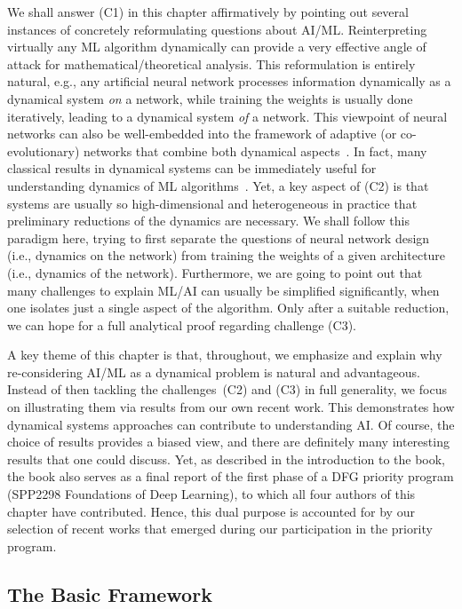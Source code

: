 \documentclass[10pt]{article}
\begin{document}
We shall answer (C1) in this chapter affirmatively by pointing out several instances of concretely reformulating questions about AI/ML. Reinterpreting virtually any ML algorithm dynamically can provide a very effective angle of attack for mathematical/theoretical analysis. This reformulation is entirely natural, e.g., any artificial neural network processes information dynamically as a dynamical system \emph{on} a network, while training the weights is usually done iteratively, leading to a dynamical system \emph{of} a network. This viewpoint of neural networks can also be well-embedded into the framework of adaptive (or co-evolutionary) networks that combine both dynamical aspects~\cite{Berneretal}. 
In fact, many classical results in dynamical systems can be immediately useful for understanding dynamics of ML algorithms~\cite{https://doi.org/10.48550/arxiv.2110.10295,Sharkovskii1}.
Yet, a key aspect of (C2) is that systems are usually so high-dimensional and heterogeneous in practice that preliminary reductions of the dynamics are necessary. We shall follow this paradigm here, trying to first separate the questions of neural network design (i.e., dynamics on the network) from training the weights of a given architecture (i.e., dynamics of the network). Furthermore, we are going to point out that many challenges to explain ML/AI can usually be simplified significantly, when one isolates just a single aspect of the algorithm. Only after a suitable reduction, we can hope for a full analytical proof regarding challenge (C3).

A key theme of this chapter is that, throughout, we emphasize and explain why re-considering AI/ML as a dynamical problem is natural and advantageous. Instead of then tackling the challenges~(C2) and (C3) in full generality, we focus on illustrating them via results from our own recent work. This demonstrates how dynamical systems approaches can contribute to understanding AI. Of course, the choice of results provides a biased view, and there are definitely many interesting results that one could discuss. Yet, as described in the introduction to the book, the book also serves as a final report of the first phase of a DFG priority program (SPP2298 Foundations of Deep Learning), to which all four authors of this chapter have contributed. Hence, this dual purpose is accounted for by our selection of recent works that emerged during our participation in the priority program. 

\subsection{The Basic Framework}
\label{cekk_sec:model}
\end{document}
